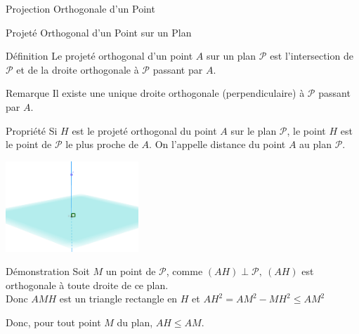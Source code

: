 \documentclass{cours}
\begin{document}
    \begin{Gpartie}{Projection Orthogonale d'un Point} 
        \begin{Spartie}{Projeté Orthogonal d'un Point sur un Plan} 
            \begin{SSSpartie}{Définition} 
                Le projeté orthogonal d'un point $A$ sur un plan $\mathcal{P}$ est l'intersection de $\mathcal{P}$ et de la droite orthogonale à $\mathcal{P}$ passant par $A$.
            \end{SSSpartie}
            \begin{SSSpartie}{Remarque} 
                Il existe une unique droite orthogonale (perpendiculaire) à $\mathcal{P}$ passant par $A$.
            \end{SSSpartie}
            \begin{SSSpartie}{Propriété} 
                Si $H$ est le projeté orthogonal du point $A$ sur le plan $\mathcal{P}$, le point $H$ est le point de $\mathcal{P}$ le plus proche de $A$. On l'appelle distance du point $A$ au plan $\mathcal{P}$.
                
                \begin{center}
                    \includegraphics[width=5cm]{rsc/12fig8.png}
                    \parbox{\linewidth}{}
                \end{center}

                \begin{SSSSpartie}{Démonstration} 
                    Soit $M$ un point de $\mathcal{P}$, comme $(AH)\perp\mathcal{P},~(AH)$ est orthogonale à toute droite de ce plan. \\ Donc $AMH$ est un triangle rectangle en $H$ et $AH^2=AM^2-MH^2\leq AM^2$

                    Donc, pour tout point $M$ du plan, $AH\leq AM$.


\end{SSSSpartie}
\end{SSSpartie}
\end{Spartie}
\end{Gpartie}
\end{document}
